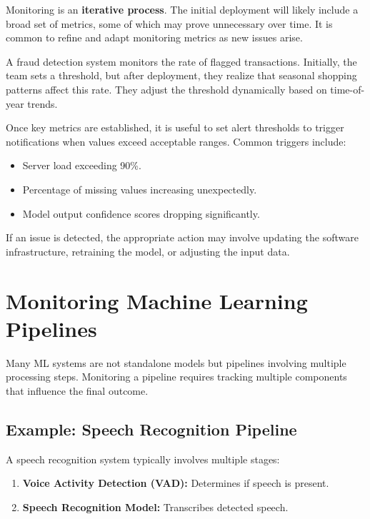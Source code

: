 \documentclass[12pt,openany]{book}
\begin{document}
Monitoring is an \textbf{iterative process}. The initial deployment will likely include a broad set of metrics, some of which may prove unnecessary over time. It is common to refine and adapt monitoring metrics as new issues arise.

\begin{examplebox}
   A fraud detection system monitors the rate of flagged transactions. Initially, the team sets a threshold, but after deployment, they realize that seasonal shopping patterns affect this rate. They adjust the threshold dynamically based on time-of-year trends.
\end{examplebox}

Once key metrics are established, it is useful to set alert thresholds to trigger notifications when values exceed acceptable ranges. Common triggers include:

\begin{itemize}
    \item Server load exceeding 90\%.
    \item Percentage of missing values increasing unexpectedly.
    \item Model output confidence scores dropping significantly.
\end{itemize}

If an issue is detected, the appropriate action may involve updating the software infrastructure, retraining the model, or adjusting the input data.



\section{Monitoring Machine Learning Pipelines}

Many ML systems are not standalone models but pipelines involving multiple processing steps. Monitoring a pipeline requires tracking multiple components that influence the final outcome.


\subsection{Example: Speech Recognition Pipeline}

A speech recognition system typically involves multiple stages:

\begin{enumerate}
    \item \textbf{Voice Activity Detection (VAD):} Determines if speech is present.
    \item \textbf{Speech Recognition Model:} Transcribes detected speech.
\end{enumerate}
\end{document}
